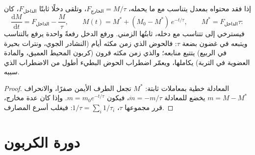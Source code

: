 \begin{theorem}\label{thm:b2:biogeochemical-cycles:box}
إذا فقد  محتواه بمعدل يتناسب مع ما
يحمله، $F_{\text{الخارج}} = M/\tau$، وتلقى دخلًا ثابتًا
$F_{\text{الداخل}}$، كان
\[
\frac{\mathrm{d}M}{\mathrm{d}t} = F_{\text{الداخل}} - \frac{M}{\tau},
\qquad
M(t) = M^{*} + (M_0 - M^{*})\,e^{-t/\tau}, \qquad M^{*} = F_{\text{الداخل}}\tau :
\]
فيسترخي  إلى  تتناسب مع دخله،
 ثابتُها الزمني. ورفع الدخل رفعةً واحدة
يرفع  بالتناسب ويتبعه 
في غضون بضعة $\tau$: فالحوض الذي زمن مكثه أيام
(النشادر الجوي، ونترات بحيرة في الربيع) يتتبع
منابعه؛ والذي زمن مكثه قرون (كربون المحيط العميق،
والمادة العضوية في التربة) يكاملها، ويعمّر اضطراب الحوض
البطيء أطول من الاضطراب الذي سببه.
\end{theorem}
\begin{proof}
المعادلة خطية بمعاملات ثابتة: 
$M^{*}$ تجعل الطرف الأيمن صفرًا، والانحراف $m = M - M^{*}$
يخضع للمعادلة $\dot m = -m/\tau$، فيكون $m = m_0 e^{-t/\tau}$. وإذا كان 
عدة مخارج، قرر مجموعها $\tau$، $1/\tau = \sum_i
1/\tau_i$: فيغلب أسرع المصارف.
\end{proof}

\section{دورة الكربون}

